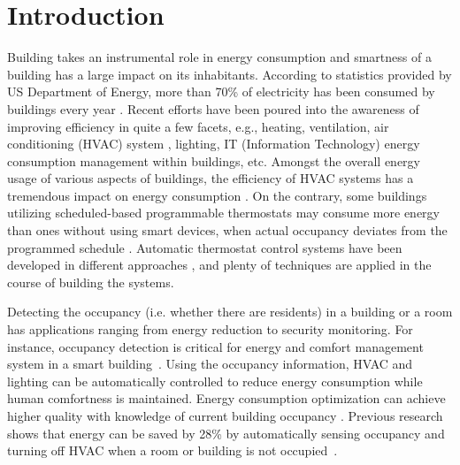 \section{Introduction}
\label{sec:intro}
Building takes an instrumental role in energy consumption and smartness of a
building has a large impact on its inhabitants. \textcolor{feb18rev}{According to
statistics provided by US Department of Energy, more than 70\% of electricity
has been consumed by buildings every year \cite{doe_annual}. Recent efforts
have been poured into the awareness of
improving efficiency in quite a few facets, e.g., heating, ventilation, air
conditioning (HVAC) system \cite{erickson2009energy}\cite{gao2009selfprog},
lighting\cite{delaney2009eval}, IT (Information Technology) energy consumption management within
buildings\cite{agarwal2009augnet}\cite{agarwal2010sleep}, etc.} Amongst the
overall energy usage of various aspects of buildings, the efficiency of HVAC
systems has a tremendous impact on energy consumption \cite{hobby2012analysis}.
\textcolor{feb18rev}{On the contrary, some buildings utilizing scheduled-based
programmable thermostats may consume more energy than ones without using smart
devices, when actual occupancy deviates from the programmed schedule
\cite{bias1999elec}.} Automatic thermostat control systems have been developed
in different approaches \cite{thomas2012intelligent}\cite{lu2012eval}, and
plenty of techniques are applied in the course of building the systems.

Detecting the occupancy (i.e. whether there are residents) in a building or a
room has applications ranging from energy reduction to security monitoring. For
instance, occupancy detection is critical for energy and comfort management
system in a smart building~\cite{Nguyen2013Energy}.  Using the occupancy
information, HVAC and lighting can be automatically controlled to reduce energy
consumption while human comfortness is maintained. Energy consumption optimization can
achieve higher quality with knowledge of current building occupancy
\cite{majumdar2014energy}. Previous research shows that energy
can be saved by 28\% by automatically sensing occupancy and turning off HVAC
when a room or building is not occupied~\cite{Lu:SenSys10}.

